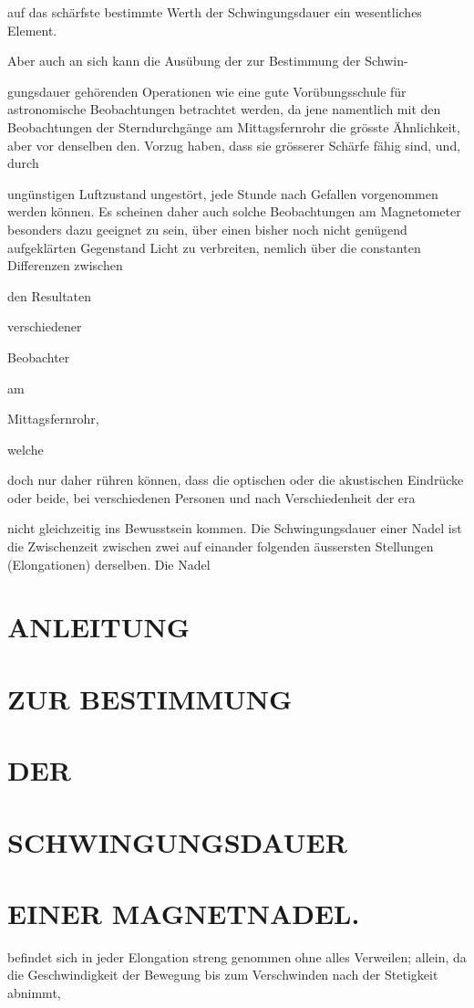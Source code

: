 \documentclass[12pt,a4paper]{article}
\begin{document}
auf das schärfste bestimmte Werth der Schwingungsdauer ein wesentliches Element.

Aber auch an sich kann die Ausübung der zur Bestimmung der Schwin-

gungsdauer gehörenden Operationen wie eine gute Vorübungsschule für astronomische Beobachtungen betrachtet werden, da jene namentlich mit den Beobachtungen der Sterndurchgänge am Mittagsfernrohr die grösste Ähnlichkeit, aber vor denselben den. Vorzug haben, dass sie grösserer Schärfe fähig sind, und, durch

ungünstigen Luftzustand ungestört, jede Stunde nach Gefallen vorgenommen werden können. Es scheinen daher auch solche Beobachtungen am Magnetometer besonders dazu geeignet zu sein, über einen bisher noch nicht genügend aufgeklärten Gegenstand Licht zu verbreiten, nemlich über die constanten Differenzen zwischen

den Resultaten

verschiedener

Beobachter

am

Mittagsfernrohr,

welche

doch nur daher rühren können, dass die optischen oder die akustischen Eindrücke oder beide, bei verschiedenen Personen und nach Verschiedenheit der era

nicht gleichzeitig ins Bewusstsein kommen. Die Schwingungsdauer einer Nadel ist die Zwischenzeit zwischen zwei auf einander folgenden äussersten Stellungen (Elongationen) derselben. Die Nadel

\section*{ANLEITUNG}
\section*{ZUR BESTIMMUNG}
\section*{DER}
\section*{SCHWINGUNGSDAUER}
\section*{EINER MAGNETNADEL.}
befindet sich in jeder Elongation streng genommen ohne alles Verweilen; allein, da die Geschwindigkeit der Bewegung bis zum Verschwinden nach der Stetigkeit abnimmt,
\end{document}
